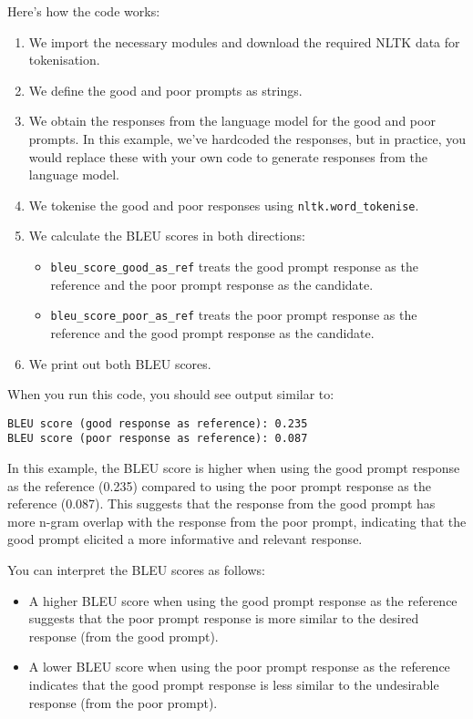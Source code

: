 \documentclass[
]{agujournal2019}
\providecommand{\tightlist}{%
  \setlength{\itemsep}{0pt}\setlength{\parskip}{0pt}}\usepackage{longtable,booktabs,array}
\begin{document}
Here's how the code works:

\begin{enumerate}
\def\labelenumi{\arabic{enumi}.}
\tightlist
\item
  We import the necessary modules and download the required NLTK data
  for tokenisation.
\item
  We define the good and poor prompts as strings.
\item
  We obtain the responses from the language model for the good and poor
  prompts. In this example, we've hardcoded the responses, but in
  practice, you would replace these with your own code to generate
  responses from the language model.
\item
  We tokenise the good and poor responses using
  \texttt{nltk.word\_tokenise}.
\item
  We calculate the BLEU scores in both directions:

  \begin{itemize}
  \tightlist
  \item
    \texttt{bleu\_score\_good\_as\_ref} treats the good prompt response
    as the reference and the poor prompt response as the candidate.
  \item
    \texttt{bleu\_score\_poor\_as\_ref} treats the poor prompt response
    as the reference and the good prompt response as the candidate.
  \end{itemize}
\item
  We print out both BLEU scores.
\end{enumerate}

When you run this code, you should see output similar to:

\begin{verbatim}
BLEU score (good response as reference): 0.235
BLEU score (poor response as reference): 0.087
\end{verbatim}

In this example, the BLEU score is higher when using the good prompt
response as the reference (0.235) compared to using the poor prompt
response as the reference (0.087). This suggests that the response from
the good prompt has more n-gram overlap with the response from the poor
prompt, indicating that the good prompt elicited a more informative and
relevant response.

You can interpret the BLEU scores as follows:

\begin{itemize}
\tightlist
\item
  A higher BLEU score when using the good prompt response as the
  reference suggests that the poor prompt response is more similar to
  the desired response (from the good prompt).
\item
  A lower BLEU score when using the poor prompt response as the
  reference indicates that the good prompt response is less similar to
  the undesirable response (from the poor prompt).
\end{itemize}
\end{document}
